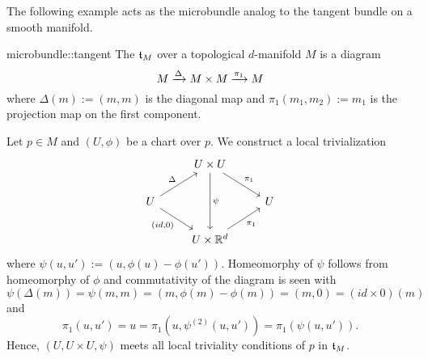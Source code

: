 \begin{myparagraph}
    The following example acts as the microbundle analog to the tangent bundle on a smooth manifold.
\end{myparagraph}

\begin{myexample}{microbundle::tangent}
    The  $\mathfrak{t}_M$ over a topological $d$-manifold $M$ is a diagram
    \[ M \xrightarrow{\Delta} M \times M \xrightarrow{\pi_1} M{} \]
    where $\Delta(m) := (m, m)$ is the diagonal map and $\pi_1(m_1, m_2) := m_1$ is the projection map on the first component.
    \begin{myproof}
        Let $p \in M$ and $(U, \phi)$ be a chart over $p$.
        We construct a local trivialization
        \[\begin{tikzcd}
            & U \times U \ar[dr, "\pi_1"] \ar[dd, "{\psi}"] & \\
            U \ar[ur, "\Delta"] \ar[dr, "{(id, 0)}"'] & & U \\
            & U \times \R^d \ar[ur, "\pi_1"'] &
        \end{tikzcd}\]
        where $\psi(u, u') := (u, \phi(u) - \phi(u'))$.
        Homeomorphy of $\psi$ follows from homeomorphy of $\phi$ and commutativity of the diagram is seen with
        \[ \psi(\Delta(m)) = \psi(m, m) = (m, \phi(m) - \phi(m)) = (m, 0) = (id \times 0)(m)\]
        and
        \[ \pi_1(u, u') = u = \pi_1(u, \psi^{(2)}(u, u')) = \pi_1(\psi(u, u')). \]
        Hence, $(U, U \times U, \psi)$ meets all local triviality conditions of $p$ in $\mathfrak{t}_M$.
    \end{myproof}
\end{myexample}